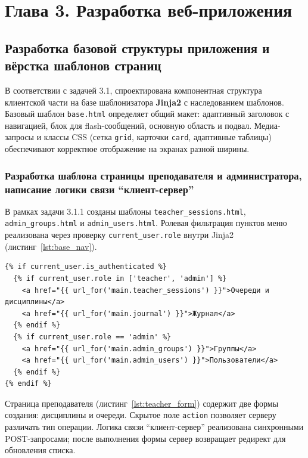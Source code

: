 \section*{Глава 3. Разработка веб-приложения}

\subsection{Разработка базовой структуры приложения и вёрстка шаблонов страниц}

В соответствии с задачей 3.1, спроектирована компонентная структура клиентской части на базе шаблонизатора \textbf{Jinja2} с наследованием шаблонов. Базовый шаблон \texttt{base.html} определяет общий макет: адаптивный заголовок с навигацией, блок для flash-сообщений, основную область и подвал. Медиа-запросы и классы CSS (сетка \texttt{grid}, карточки \texttt{card}, адаптивные таблицы) обеспечивают корректное отображение на экранах разной ширины.

\subsubsection{Разработка шаблона страницы преподавателя и администратора, написание логики связи ``клиент-сервер''}

В рамках задачи 3.1.1 созданы шаблоны \texttt{teacher\_sessions.html}, \texttt{admin\_groups.html} и \texttt{admin\_users.html}. Ролевая фильтрация пунктов меню реализована через проверку \texttt{current\_user.role} внутри Jinja2 (листинг~\ref{lst:base_nav}).

\begin{lstlisting}[caption={Фрагмент навигации с ролевым разделением (base.html)}, label={lst:base_nav}]
{% if current_user.is_authenticated %}
  {% if current_user.role in ['teacher', 'admin'] %}
    <a href="{{ url_for('main.teacher_sessions') }}">Очереди и дисциплины</a>
    <a href="{{ url_for('main.journal') }}">Журнал</a>
  {% endif %}
  {% if current_user.role == 'admin' %}
    <a href="{{ url_for('main.admin_groups') }}">Группы</a>
    <a href="{{ url_for('main.admin_users') }}">Пользователи</a>
  {% endif %}
{% endif %}
\end{lstlisting}

Страница преподавателя (листинг~\ref{lst:teacher_form}) содержит две формы создания: дисциплины и очереди. Скрытое поле \texttt{action} позволяет серверу различать тип операции. Логика связи ``клиент-сервер'' реализована синхронными POST-запросами; после выполнения формы сервер возвращает редирект для обновления списка.

